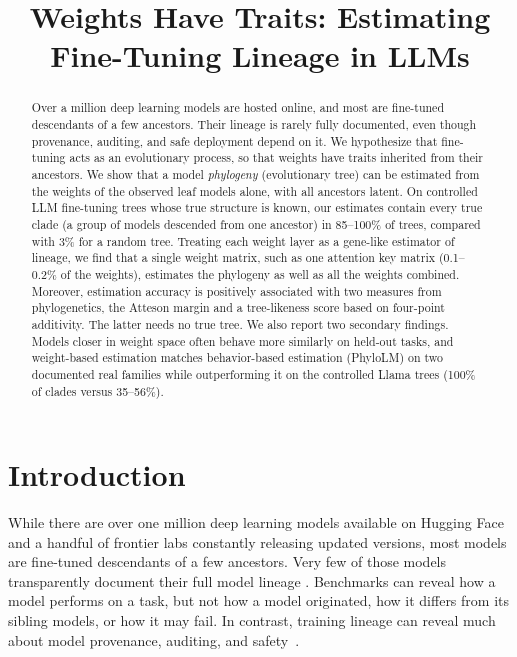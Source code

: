 \documentclass{article}
\title{Weights Have Traits: Estimating Fine-Tuning Lineage in LLMs}
\theoremstyle{definition}
\theoremstyle{plain}
\begin{document}
\maketitle

\begin{abstract}
Over a million deep learning models are hosted online, and most are fine-tuned descendants of a few ancestors. Their lineage is rarely fully documented, even though provenance, auditing, and safe deployment depend on it. We hypothesize that fine-tuning acts as an evolutionary process, so that weights have traits inherited from their ancestors. We show that a model \textit{phylogeny} (evolutionary tree) can be estimated from the weights of the observed leaf models alone, with all ancestors latent. On controlled LLM fine-tuning trees whose true structure is known, our estimates contain every true clade (a group of models descended from one ancestor) in 85--100\% of trees, compared with 3\% for a random tree. Treating each weight layer as a gene-like estimator of lineage, we find that a single weight matrix, such as one attention key matrix (0.1--0.2\% of the weights), estimates the phylogeny as well as all the weights combined. Moreover, estimation accuracy is positively associated with two measures from phylogenetics, the Atteson margin and a tree-likeness score based on four-point additivity. The latter needs no true tree. We also report two secondary findings. Models closer in weight space often behave more similarly on held-out tasks, and weight-based estimation matches behavior-based estimation (PhyloLM) on two documented real families while outperforming it on the controlled Llama trees (100\% of clades versus 35--56\%).

\end{abstract}

\section{Introduction}
\label{sec:intro}




While there are over one million deep learning models available on Hugging Face and a handful of frontier
labs constantly releasing updated versions, most models are
fine-tuned descendants of a few ancestors.  Very few of those models transparently document their full model lineage \citep{horwitz2025chartatlasworldsmodels}. Benchmarks can reveal how a model performs on a task, but not how a model originated, how it differs from its sibling models, or how it may
fail. In contrast, training lineage can reveal much about model provenance, auditing, and safety~\citep{behavioral2026provenance, nikolic2026model, tensorguard2025}.
\end{document}
